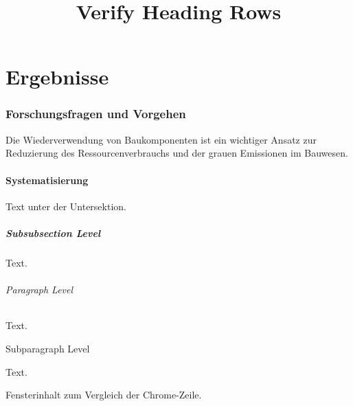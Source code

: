 \documentclass[type=paper,theme=light,language=de]{semio}
\title{Verify Heading Rows}
\begin{document}
\part{Ergebnisse}
\section{Forschungsfragen und Vorgehen}
Die Wiederverwendung von Baukomponenten ist ein wichtiger Ansatz zur Reduzierung des
Ressourcenverbrauchs und der grauen Emissionen im Bauwesen.
\subsection{Systematisierung}
Text unter der Untersektion.
\subsubsection{Subsubsection Level}
Text.
\paragraph{Paragraph Level}
Text.
\subparagraph{Subparagraph Level}
Text.
\begin{Window}[title=Fensterkopf]
Fensterinhalt zum Vergleich der Chrome-Zeile.
\end{Window}
\end{document}
